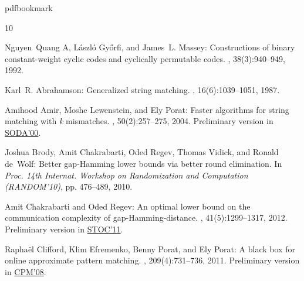 \documentclass[11pt]{article}
\numberwithin{equation}{section}
\theoremstyle{definition}
\theoremstyle{plain}
\begin{document}
\providecommand{\bibhead}[1]{}
\expandafter\ifx\csname pdfbookmark\endcsname\relax%
  \providecommand{\tocrefpdfbookmark}{}
\else\providecommand{\tocrefpdfbookmark}{%
   \hypertarget{tocreferences}{}%
   \pdfbookmark[1]{References}{tocreferences}}%
\fi

\tocrefpdfbookmark
\begin{thebibliography}{10}

\bibhead{AGM:1992}
{\sc Nguyen~Quang A, L\'{a}szl\'{o} Gy{\H{o}}rfi, and James~L. Massey}:
  Constructions of binary constant-weight cyclic codes and cyclically
  permutable codes.
, 38(3):940--949, 1992.
\newblock [\epfmtdoi{10.1109/18.135636}]

\bibhead{Abrahamson:1987}
{\sc Karl~R. Abrahamson}: Generalized string matching.
, 16(6):1039--1051, 1987.
\newblock [\epfmtdoi{10.1137/0216067}]

\bibhead{ALP:2004}
{\sc Amihood Amir, Moshe Lewenstein, and Ely Porat}: Faster algorithms for
  string matching with \textit{k} mismatches.
, 50(2):257--275, 2004.
\newblock Preliminary version in
  \href{http://dl.acm.org/citation.cfm?id=338219.338641}{SODA'00}.
\newblock [\epfmtdoi{10.1016/S0196-6774(03)00097-X}]

\bibhead{BCRT:10}
{\sc Joshua Brody, Amit Chakrabarti, Oded Regev, Thomas Vidick, and Ronald
  de~Wolf}: Better gap-{H}amming lower bounds via better round elimination.
\newblock In {\em Proc. 14th Internat. Workshop on Randomization and
  Computation (RANDOM'10)}, pp. 476--489, 2010.

\bibhead{Chakrabarti:11}
{\sc Amit Chakrabarti and Oded Regev}: An optimal lower bound on the
  communication complexity of gap-{H}amming-distance.
, 41(5):1299--1317, 2012.
\newblock Preliminary version in
  \href{http://doi.org/10.1145/1993636.1993644}{STOC'11}.
\newblock [\epfmtdoi{10.1137/120861072}]

\bibhead{CEPP:2011}
{\sc Rapha{\"e}l Clifford, Klim Efremenko, Benny Porat, and Ely Porat}: A black
  box for online approximate pattern matching.
, 209(4):731--736, 2011.
\newblock Preliminary version in
  \href{https://doi.org/10.1007/978-3-540-69068-9\_15}{CPM'08}.
\newblock [\epfmtdoi{10.1016/j.ic.2010.12.007}]


\end{thebibliography}
\end{document}
